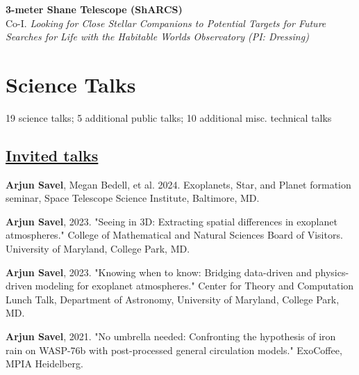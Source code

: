 \documentclass[letterpaper,11pt]{article}
\newcommand{\shorterSection}[1]{\vspace{-10pt}\section{#1}}
\newcommand{\shortershorterSection}[1]{\vspace{-10pt}\subsection{#1}}
\begin{document}
\begin{list}{}{\cvlist}
     \item[{\color{numcolor}}]\textbf{3-meter Shane Telescope (ShARCS)} \\
     Co-I.  \textit{Looking for Close Stellar Companions to Potential Targets for Future Searches for Life with the Habitable Worlds Observatory (PI: Dressing)}\\



     
  
  \end{list}

\shorterSection{Science Talks}
\vspace{-2pt}
19 science talks; 5 additional public talks; 10 additional misc. technical talks
\vspace{1pt}
\shortershorterSection{\underline{Invited talks}}
\small
  \begin{list}{}{\cvlist}

    \item[{\color{numcolor}\scriptsize4}] \textbf{Arjun Savel}, Megan Bedell, et al. 2024. Exoplanets, Star, and Planet formation seminar, Space Telescope Science Institute, Baltimore, MD.


  \item[{\color{numcolor}\scriptsize3}] \textbf{Arjun Savel}, 2023. "Seeing in 3D: Extracting spatial differences in exoplanet atmospheres." College of Mathematical and Natural Sciences Board of Visitors. University of Maryland, College Park, MD.

  

  \item[{\color{numcolor}\scriptsize2}] \textbf{Arjun Savel}, 2023. "Knowing when to know: Bridging data-driven and physics-driven modeling for exoplanet atmospheres." Center for Theory and Computation Lunch Talk, Department of Astronomy, University of Maryland, College Park, MD.

   \item[{\color{numcolor}\scriptsize1}] \textbf{Arjun Savel}, 2021. "No umbrella needed: Confronting the hypothesis of iron rain on WASP-76b with post-processed general circulation models." ExoCoffee, MPIA Heidelberg.


  \end{list}
\end{document}
